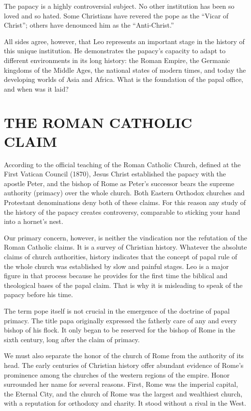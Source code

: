 The papacy is a highly controversial subject. No other institution has been so loved and so hated.
Some Christians have revered the pope as the “Vicar of Christ”; others have denounced him as the
“Anti-Christ.”

All sides agree, however, that Leo represents an important stage in the history of this unique
institution. He demonstrates the papacy’s capacity to adapt to different environments in its long
history: the Roman Empire, the Germanic kingdoms of the Middle Ages, the national states of modern
times, and today the developing worlds of Asia and Africa. What is the foundation of the papal
office, and when was it laid?

\section{THE ROMAN CATHOLIC CLAIM}

According to the official teaching of the Roman Catholic Church, defined at the First Vatican
Council (1870), Jesus Christ established the papacy with the apostle Peter, and the bishop of Rome
as Peter’s successor bears the supreme authority (primacy) over the whole church. Both Eastern
Orthodox churches and Protestant denominations deny both of these claims. For this reason any study
of the history of the papacy creates controversy, comparable to sticking your hand into a hornet’s
nest.

Our primary concern, however, is neither the vindication nor the refutation of the Roman Catholic
claims. It is a survey of Christian history. Whatever the absolute claims of church authorities,
history indicates that the concept of papal rule of the whole church was established by slow and
painful stages. Leo is a major figure in that process because he provides for the first time the
biblical and theological bases of the papal claim. That is why it is misleading to speak of the
papacy before his time.

The term pope itself is not crucial in the emergence of the doctrine of papal primacy. The title
papa originally expressed the fatherly care of any and every bishop of his flock. It only began to
be reserved for the bishop of Rome in the sixth century, long after the claim of primacy.

We must also separate the honor of the church of Rome from the authority of its head. The early
centuries of Christian history offer abundant evidence of Rome’s prominence among the churches of
the western regions of the empire. Honor surrounded her name for several reasons. First, Rome was
the imperial capital, the Eternal City, and the church of Rome was the largest and wealthiest
church, with a reputation for orthodoxy and charity. It stood without a rival in the West.

